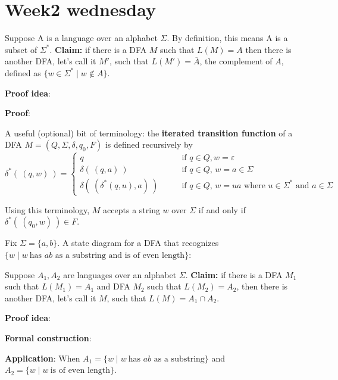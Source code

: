 \documentclass[12pt, oneside]{article}
\begin{document}
\vspace{70pt} \vfill
\section*{Week2 wednesday}


Suppose A is a language over an alphabet $\Sigma$. By definition, this means A is a subset of $\Sigma^*$.
{\bf Claim:} if there is a DFA $M$ such that $L(M) = A$ then there is another DFA, let's call it $M'$, such that 
$L(M') = \overline{A}$, the complement of $A$, defined as $\{ w \in \Sigma^* \mid w \notin A \}$.

{\bf Proof idea}:


{\bf Proof}: 




\vfill
A useful (optional) bit of terminology: the {\bf iterated transition function} of a DFA
$M = (Q, \Sigma, \delta, q_0, F)$ is defined recursively by
\[
\delta^* (~(q,w)~) 
=\begin{cases}
q  \qquad &\text{if $q \in Q, w = \varepsilon$} \\
\delta( ~(q,a)~) \qquad &\text{if $q \in Q$, $w = a \in \Sigma$ } \\
\delta(~(\delta^*(q,u), a) ~) \qquad &\text{if $q \in Q$, $w = ua$ where $u \in  \Sigma^*$ and $a \in \Sigma$}
\end{cases}
\]

Using  this terminology, $M$ accepts a string $w$ over $\Sigma$ if and only if $\delta^*( ~(q_0,w)~) \in F$.

\newpage

Fix  $\Sigma = \{a,b\}$. A state diagram for a DFA that recognizes 
$\{w \mid w~\text{has $ab$ as a substring and is of even length} \}$:


\vspace{120pt}


Suppose $A_1, A_2$ are languages over an alphabet $\Sigma$.
{\bf Claim:} if there is a DFA $M_1$ such that $L(M_1) = A_1$ and 
DFA $M_2$ such that $L(M_2) = A_2$, then there is another DFA, let's call it $M$, such that 
$L(M) = A_1 \cap A_2$.

{\bf Proof idea}:


{\bf Formal construction}: 


\vspace{70pt}

{\bf Application}:  When $A_1 = \{w \mid w~\text{has $ab$ as a substring} \}$ and 
$A_2 = \{ w \mid w~\text{is of even length} \}$.
\end{document}
